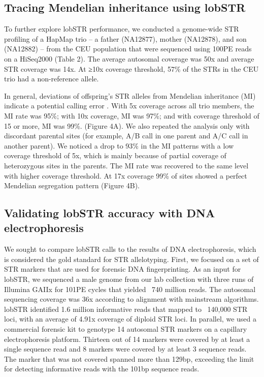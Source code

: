 \subsection{Tracing Mendelian inheritance using lobSTR}
To further explore lobSTR performance, we conducted a genome-wide STR profiling of a HapMap trio -- a father (NA12877), mother (NA12878), and son (NA12882) -- from the CEU population that were sequenced using 100PE reads on a HiSeq2000 (Table 2). The average autosomal coverage was 50x and average STR coverage was 14x. At ≥10x coverage threshold, 57\% of the STRs in the CEU trio had a non-reference allele. 

In general, deviations of offspring’s STR alleles from Mendelian inheritance (MI) indicate a potential calling error \cite{EwenBahloTreloarEtAl2000}. With 5x coverage across all trio members, the MI rate was 95\%; with 10x coverage, MI was 97\%; and with coverage threshold of 15 or more, MI was 99\%. (Figure 4A). We also repeated the analysis only with discordant parental sites (for example, A/B call in one parent and A/C call in another parent). We noticed a drop to 93\% in the MI patterns with a low coverage threshold of 5x, which is mainly because of partial coverage of heterozygous sites in the parents. The MI rate was recovered to the same level with higher coverage threshold. At 17x coverage 99\% of sites showed a perfect Mendelian segregation pattern (Figure 4B). 

\subsection{Validating lobSTR accuracy with DNA electrophoresis}
We sought to compare lobSTR calls to the results of DNA electrophoresis, which is considered the gold standard for STR allelotyping. First, we focused on a set of STR markers that are used for forensic DNA fingerprinting. As an input for lobSTR, we sequenced a male genome from our lab collection with three runs of Illumina GAIIx for 101PE cycles that yielded ~740 million reads. The autosomal sequencing coverage was 36x according to alignment with mainstream algorithms. lobSTR identified 1.6 million informative reads that mapped to ~140,000 STR loci, with an average of 4.91x coverage of diploid STR loci. In parallel, we used a commercial forensic kit to genotype 14 autosomal STR markers on a capillary electrophoresis platform. Thirteen out of 14 markers were covered by at least a single sequence read and 8 markers were covered by at least 3 sequence reads. The marker that was not covered spanned more than 129bp, exceeding the limit for detecting informative reads with the 101bp sequence reads.

